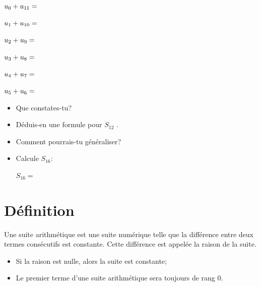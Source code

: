 \documentclass[a4paper,12pt]{report}
\begin{document}
\par \setlength{\columnseprule}{0 pt}
          \begin{minipage}[t]{\linewidth}
          \begin{multicols}{3}
\(u_{0}+u_{11}=\dotfill\)

\(u_{1}+u_{10}=\dotfill\)

\(u_{2}+u_{9}=\dotfill\)

\(u_{3}+u_8=\dotfill\)

\(u_{4}+u_7=\dotfill\)

\(u_{5}+u_6=\dotfill\)


\end{multicols}\end{minipage}
\begin{itemize}
\item Que constates-tu?\dotfill

\dotfill
\end{itemize}


\begin{itemize}
\item Déduis-en une formule pour \(S_{12}\) .\dotfill

\dotfill
\item Comment pourrais-tu généraliser?\dotfill

\dotfill
\item Calcule \(S_{16}:\)

\(S_{16}=\) \dotfill
\end{itemize}

\section{Définition}
\label{sec:org2836874}

\begin{definition}
Une suite arithmétique est une suite numérique telle que la
différence entre deux termes consécutifs est constante. Cette
différence est appelée la raison de la suite.
\end{definition}

\begin{remarque}
\begin{itemize}
\item Si la raison est nulle, alors la suite est constante;
\item Le premier terme d'une suite arithmétique sera toujours de rang \(0\).
\end{itemize}
\end{remarque}
\end{document}
